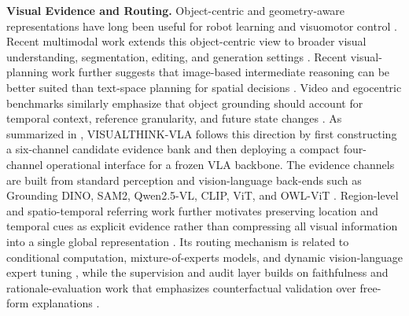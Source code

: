 \noindent\textbf{Visual Evidence and Routing.}
Object-centric and geometry-aware representations have long been useful for robot learning and visuomotor control \citep{shridhar2022perceiver,zhu2022viola,chi2023diffusion,belkhale2023hydra}. Recent multimodal work extends this object-centric view to broader visual understanding, segmentation, editing, and generation settings \citep{ravi2024sam2,yuan2026lmms,zhong2026unified}. Recent visual-planning work further suggests that image-based intermediate reasoning can be better suited than text-space planning for spatial decisions \citep{xu2025visual}. Video and egocentric benchmarks similarly emphasize that object grounding should account for temporal context, reference granularity, and future state changes \citep{openx2023,yuan2025videorefer,yuan2025eoc}. As summarized in , VISUALTHINK-VLA follows this direction by first constructing a six-channel candidate evidence bank and then deploying a compact four-channel operational interface for a frozen VLA backbone. The evidence channels are built from standard perception and vision-language back-ends such as Grounding DINO, SAM2, Qwen2.5-VL, CLIP, ViT, and OWL-ViT \citep{liu2023groundingdino,ravi2024sam2,qwen2025qwen25vl,radford2021learning,dosovitskiy2021image,minderer2022owlvit}. Region-level and spatio-temporal referring work further motivates preserving location and temporal cues as explicit evidence rather than compressing all visual information into a single global representation \citep{minderer2022owlvit,yuan2025pixelrefer}. Its routing mechanism is related to conditional computation, mixture-of-experts models, and dynamic vision-language expert tuning \citep{shazeer2017moe,lepikhin2020gshard,fedus2022switch,zhang2024hyperllava}, while the supervision and audit layer builds on faithfulness and rationale-evaluation work that emphasizes counterfactual validation over free-form explanations \citep{deyoung2020eraser,jacovi2020towards,siegel-etal-2024-probabilities,kamahi-yaghoobzadeh-2024-counterfactuals}.
